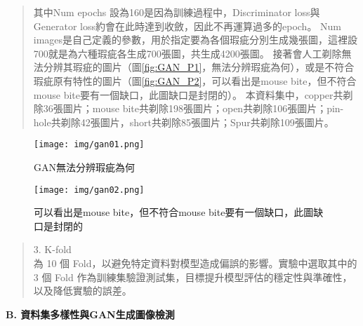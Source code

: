 \begin{flushleft}
\begin{abstract}
\begin{center}
    \end{center}
  \hspace{2em}
  其中Num epochs 設為160是因為訓練過程中，Discriminator loss與Generator loss約會在此時達到收斂，因此不再運算過多的epoch。
  Num images是自己定義的參數，用於指定要為各個瑕疵分別生成幾張圖，這裡設700就是為六種瑕疵各生成700張圖，共生成4200張圖。
  接著會人工剃除無法分辨其瑕疵的圖片（圖\ref{fig:GAN_P1}，無法分辨瑕疵為何），或是不符合瑕疵原有特性的圖片（圖\ref{fig:GAN_P2}，可以看出是mouse bite，但不符合mouse bite要有一個缺口，此圖缺口是封閉的）。
  本資料集中，copper共剃除36張圖片；mouse bite共剃除198張圖片；open共剃除106張圖片；pin-hole共剃除42張圖片，short共剃除85張圖片；Spur共剃除109張圖片。
  \end{abstract}
  \begin{figure}[htbp]
    \centering 
    \texttt{[image: img/gan01.png]} 
    \caption{GAN無法分辨瑕疵為何}
    \label{fig:GAN_P3}
    \texttt{[image: img/gan02.png]}
    \caption{可以看出是mouse bite，但不符合mouse bite要有一個缺口，此圖缺口是封閉的}
    \label{fig:GAN_P4}
  \end{figure}
  \begin{abstract}
    3. K-fold
    \\\hspace{2em}
    為 10 個 Fold，以避免特定資料對模型造成偏誤的影響。實驗中選取其中的 3 個 Fold 作為訓練集驗證測試集，目標提升模型評估的穩定性與準確性，以及降低實驗的誤差。
  \end{abstract}

  {\fontsize{10}{0} \bf B. 資料集多樣性與GAN生成圖像檢測}


\end{flushleft}
